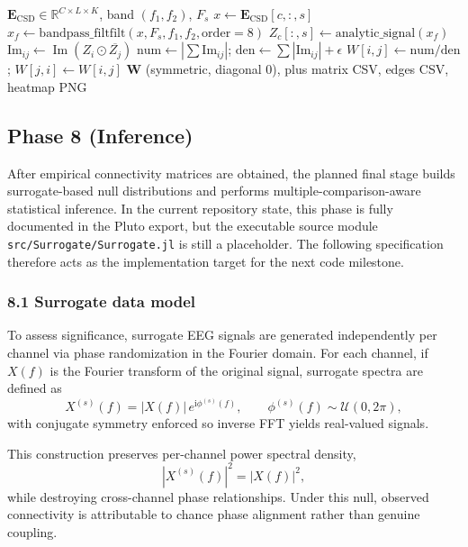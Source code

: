 \begin{algorithm}[H]
\caption{wPLI computation per band (as in \texttt{wPLI.jl})}
\begin{algorithmic}
\Require $\mathbf{E}_{\mathrm{CSD}}\in\mathbb{R}^{C\times L\times K}$, band $(f_1,f_2)$, $F_s$
    \State $x\gets \mathbf{E}_{\mathrm{CSD}}[c,:,s]$
    \State $x_f\gets \mathrm{bandpass\_filtfilt}(x,F_s,f_1,f_2,\mathrm{order}=8)$
    \State $Z_c[:,s]\gets \mathrm{analytic\_signal}(x_f)$ 
  \EndFor
\EndFor
{}
    \State $\mathrm{Im}_{ij}\gets \operatorname{Im}(Z_i\odot \overline{Z_j})$
    \State $\mathrm{num}\gets |\sum \mathrm{Im}_{ij}|$;\; $\mathrm{den}\gets \sum |\mathrm{Im}_{ij}|+\epsilon$
    \State $W[i,j]\gets \mathrm{num}/\mathrm{den}$;\; $W[j,i]\gets W[i,j]$
  \EndFor
\EndFor
\Ensure $\mathbf{W}$ (symmetric, diagonal 0), plus matrix CSV, edges CSV, heatmap PNG
\end{algorithmic}
\end{algorithm}

\subsection{Phase 8 (Inference)}

After empirical connectivity matrices are obtained, the planned final stage builds surrogate-based null distributions and performs multiple-comparison-aware statistical inference. In the current repository state, this phase is fully documented in the Pluto export, but the executable source module \texttt{src/Surrogate/Surrogate.jl} is still a placeholder. The following specification therefore acts as the implementation target for the next code milestone.

\subsubsection{8.1 Surrogate data model}
To assess significance, surrogate EEG signals are generated independently per channel via phase randomization in the Fourier domain. For each channel, if $X(f)$ is the Fourier transform of the original signal, surrogate spectra are defined as
\[
X^{(s)}(f)=|X(f)|\,e^{\mathrm{i}\phi^{(s)}(f)},
\qquad
\phi^{(s)}(f)\sim\mathcal{U}(0,2\pi),
\]
with conjugate symmetry enforced so inverse FFT yields real-valued signals.

This construction preserves per-channel power spectral density,
\[
\left|X^{(s)}(f)\right|^2=\left|X(f)\right|^2,
\]
while destroying cross-channel phase relationships. Under this null, observed connectivity is attributable to chance phase alignment rather than genuine coupling.

